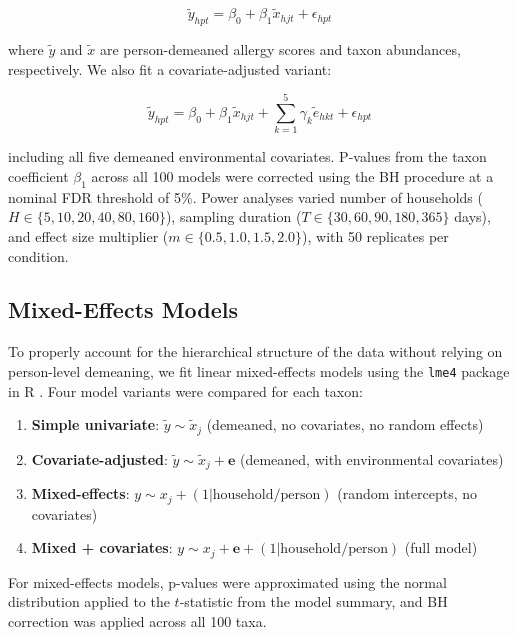\documentclass[11pt,letterpaper]{article}
\begin{document}
\begin{equation}
    \tilde{y}_{hpt} = \beta_0 + \beta_1 \tilde{x}_{hjt} + \epsilon_{hpt}
    \label{eq:univariate}
\end{equation}

\noindent where $\tilde{y}$ and $\tilde{x}$ are person-demeaned allergy scores and taxon abundances, respectively. We also fit a covariate-adjusted variant:

\begin{equation}
    \tilde{y}_{hpt} = \beta_0 + \beta_1 \tilde{x}_{hjt} + \sum_{k=1}^{5} \gamma_k \tilde{e}_{hkt} + \epsilon_{hpt}
    \label{eq:covariate_adjusted}
\end{equation}

\noindent including all five demeaned environmental covariates. P-values from the taxon coefficient $\beta_1$ across all 100 models were corrected using the BH procedure at a nominal FDR threshold of 5\%. Power analyses varied number of households ($H \in \{5, 10, 20, 40, 80, 160\}$), sampling duration ($T \in \{30, 60, 90, 180, 365\}$ days), and effect size multiplier ($m \in \{0.5, 1.0, 1.5, 2.0\}$), with 50 replicates per condition.

\subsection{Mixed-Effects Models}

To properly account for the hierarchical structure of the data without relying on person-level demeaning, we fit linear mixed-effects models using the \texttt{lme4} package in R \citep{bates2015fitting}. Four model variants were compared for each taxon:

\begin{enumerate}
    \item \textbf{Simple univariate}: $\tilde{y} \sim \tilde{x}_j$ (demeaned, no covariates, no random effects)
    \item \textbf{Covariate-adjusted}: $\tilde{y} \sim \tilde{x}_j + \mathbf{e}$ (demeaned, with environmental covariates)
    \item \textbf{Mixed-effects}: $y \sim x_j + (1|\text{household}/\text{person})$ (random intercepts, no covariates)
    \item \textbf{Mixed + covariates}: $y \sim x_j + \mathbf{e} + (1|\text{household}/\text{person})$ (full model)
\end{enumerate}

\noindent For mixed-effects models, p-values were approximated using the normal distribution applied to the $t$-statistic from the model summary, and BH correction was applied across all 100 taxa.
\end{document}
